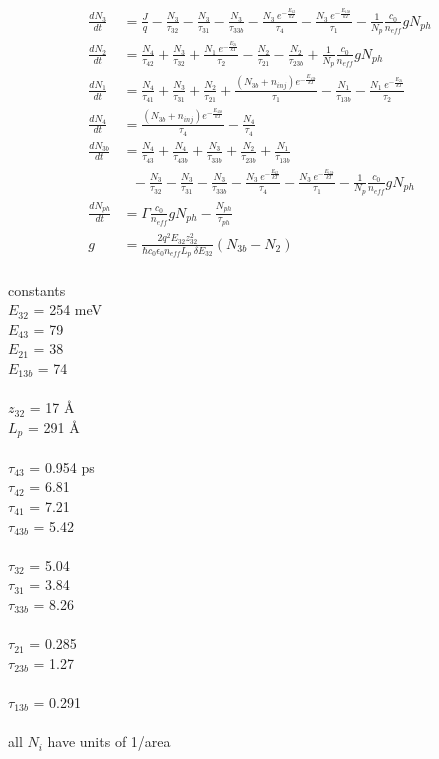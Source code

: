\documentclass{article}      %
\begin{document}
\begin{align}
\frac{dN_3}{dt} &= \frac{J}{q} - \frac{N_3}{\tau_{32}} - \frac{N_3}{\tau_{31}} - \frac{N_3}{\tau_{33b}} - \frac{N_3~e^{-\frac{E_{43}}{kT}}}{\tau_{4}} - \frac{N_3~e^{-\frac{E_{13b}}{kT}}}{\tau_{1}} - \frac{1}{N_p} \frac{c_0}{n_\mathit{eff}} g N_{ph} \nonumber\\
%
\frac{dN_2}{dt} &= \frac{N_4}{\tau_{42}} + \frac{N_3}{\tau_{32}} + \frac{N_{1}~e^{-\frac{E_{21}}{kT}}}{\tau_{2}} - \frac{N_2}{\tau_{21}} - \frac{N_2}{\tau_{23b}} + \frac{1}{N_p} \frac{c_0}{n_\mathit{eff}} g N_{ph} \nonumber\\
%
\frac{dN_1}{dt} &= \frac{N_4}{\tau_{41}} + \frac{N_3}{\tau_{31}} + \frac{N_2}{\tau_{21}} + \frac{(N_{3b}+n_{inj})e^{-\frac{E_{13b}}{kT}}}{\tau_{1}} - \frac{N_1}{\tau_{13b}} - \frac{N_{1}~e^{-\frac{E_{21}}{kT}}}{\tau_{2}}\nonumber\\
%
\frac{dN_4}{dt} &= \frac{(N_{3b}+n_{inj})e^{-\frac{E_{43b}}{kT}}}{\tau_{4}} - \frac{N_4}{\tau_{4}} \nonumber\\
%
\frac{dN_{3b}}{dt} &= \frac{N_4}{\tau_{43}} + \frac{N_4}{\tau_{43b}} + \frac{N_3}{\tau_{33b}} +\frac{N_2}{\tau_{23b}} + \frac{N_1}{\tau_{13b}} \nonumber\\
&~~~- \frac{N_3}{\tau_{32}} - \frac{N_3}{\tau_{31}} - \frac{N_3}{\tau_{33b}} - \frac{N_3~e^{-\frac{E_{43}}{kT}}}{\tau_{4}} - \frac{N_3~e^{-\frac{E_{13b}}{kT}}}{\tau_{1}} - \frac{1}{N_p} \frac{c_0}{n_\mathit{eff}} g N_{ph} \nonumber\\
%
\frac{dN_{ph}}{dt} &= \Gamma \frac{c_0}{n_\mathit{eff}} g N_{ph} - \frac{N_{ph}}{\tau_{ph}} \nonumber\\
%
g &= \frac{2 q^2 E_{32} z_{32}^2}{\hbar c_0 \epsilon_0 n_\mathit{eff} L_p~\delta E_{32}} (N_{3b}-N_2) \nonumber
\end{align}
\\
constants\\
$E_{32}$ = 254 meV\\
$E_{43}$ = 79\\
$E_{21}$ = 38\\
$E_{13b}$ = 74\\
\\
$z_{32}$ = 17 {\AA}\\
$L_p$ = 291 {\AA}\\
\\
$\tau_{43}$ = 0.954 ps\\
$\tau_{42}$ = 6.81\\
$\tau_{41}$ = 7.21\\
$\tau_{43b}$ = 5.42\\
\\
$\tau_{32}$ = 5.04\\
$\tau_{31}$ = 3.84\\
$\tau_{33b}$ = 8.26\\
\\
$\tau_{21}$ = 0.285\\
$\tau_{23b}$ = 1.27\\
\\
$\tau_{13b}$ = 0.291\\
\\
all $N_i$ have units of 1/area
\end{document}
